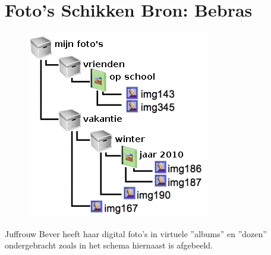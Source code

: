 \documentclass[12pt, a4paper]{article}
\begin{document}
	\begin{minipage}{\textwidth}
		\section{Foto's Schikken \hfill\small Bron: Bebras}
			\begin{figure} 
				\includegraphics[width=\linewidth]{image3}
			\end{figure}
			
			Juffrouw Bever heeft haar digital foto's in virtuele ''albums'' en ''dozen'' ondergebracht zoals in het schema hiernaast is afgebeeld. \vspace{0.5cm}


\end{minipage}
\end{document}
